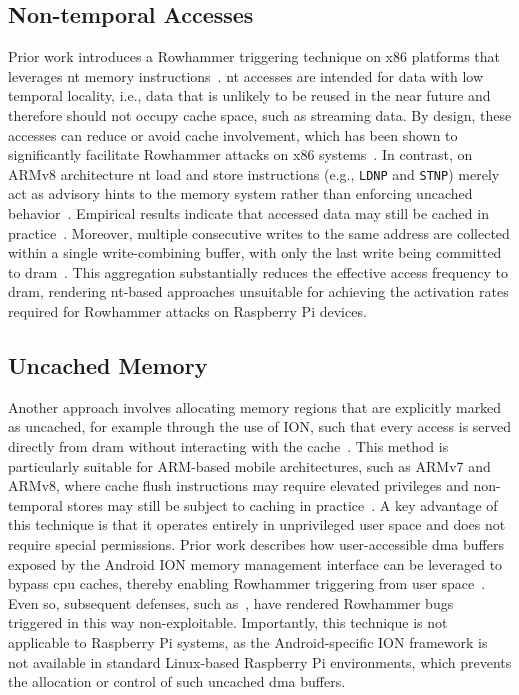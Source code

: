     \subsection{Non-temporal Accesses} \label{subsec:non-temporal-accesses}
        Prior work introduces a Rowhammer triggering technique on x86 platforms that leverages \gls{nt} 
        memory instructions~\cite{paperANewApproach}. \gls{nt} accesses are intended for data with low temporal locality, i.e., 
        data that is unlikely to be reused in the near future and therefore should not occupy cache space, 
        such as streaming data. By design, these accesses can reduce or avoid cache involvement, which has 
        been shown to significantly facilitate Rowhammer attacks on x86 systems~\cite{paperANewApproach}. In contrast, on ARMv8 architecture
        \gls{nt} load and store instructions (e.g., \texttt{LDNP} and \texttt{STNP}) merely act as advisory hints to the memory 
        system rather than enforcing uncached behavior~\cite{paperDrammer}. Empirical results indicate that accessed data 
        may still be cached in practice~\cite{paperTriggeringRHHardwareFault}. Moreover, multiple consecutive writes to the same address are 
        collected within a single write-combining buffer, with only the last write being committed to \gls{dram}~\cite{toolRowhammering}.
        This aggregation substantially reduces the effective access frequency to \gls{dram}, rendering \gls{nt}-based approaches 
        unsuitable for achieving the activation rates required for Rowhammer attacks on Raspberry Pi devices.
    
    \subsection{Uncached Memory} \label{subsec:uncached-memory}
        Another approach involves allocating memory regions that are explicitly marked as uncached, for example 
        through the use of ION, such that every access is served directly from \gls{dram} without interacting with the 
        cache~\cite{paperDrammer}. This method is particularly suitable for ARM-based mobile architectures, such as ARMv7 and 
        ARMv8, where cache flush instructions may require elevated privileges and non-temporal stores may still 
        be subject to caching in practice~\cite{toolRowhammering}. A key advantage of this technique is that it operates entirely 
        in unprivileged user space and does not require special permissions. Prior work describes how 
        user-accessible \gls{dma} buffers exposed by the Android ION memory management interface can be leveraged to 
        bypass \gls{cpu} caches, thereby enabling Rowhammer triggering from user space~\cite{paperDrammer, paperTriggeringRHHardwareFault}. Even so, subsequent 
        defenses, such as~\cite{paperGuardION}, have rendered Rowhammer bugs triggered in this way non-exploitable. 
        Importantly, this technique is not applicable to Raspberry Pi systems, as the Android-specific ION framework 
        is not available in standard Linux-based Raspberry Pi environments, which prevents the allocation or control 
        of such uncached \gls{dma} buffers.
    
    

    
